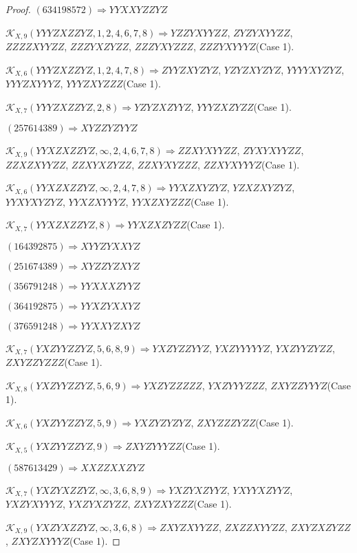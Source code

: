 \documentclass[12pt]{article}
\theoremstyle{plain}
\theoremstyle{definition}
\theoremstyle{remark}
\newcommand{\fancy}[1]{\mathcal{#1}}
\def\K{\fancy{K}}
\begin{document}
\begin{proof}
	$(6 3 4 1 9 8 5 7 2)\Rightarrow YYXXYZZYZ$
	
	
	
	$\K_{X,9}(YYYZXZZYZ,1, 2, 4, 6, 7, 8)\Rightarrow $$YZZYXYYZZ$, $ZYZYXYYZZ$, $ZZZZXYYZZ$, $ZZZYXZYZZ$, $ZZZYXYZZZ$, $ZZZYXYYYZ$(Case 1).
	
	$\K_{X,6}(YYYZXZZYZ,1, 2, 4, 7, 8)\Rightarrow $$ZYYZXYZYZ$, $YZYZXYZYZ$, $YYYYXYZYZ$, $YYYZXYYYZ$, $YYYZXYZZZ$(Case 1).
	
	$\K_{X,7}(YYYZXZZYZ,2, 8)\Rightarrow $$YZYZXZYYZ$, $YYYZXZYZZ$(Case 1).
	
	
	
	$(2 5 7 6 1 4 3 8 9)\Rightarrow XYZZYZYYZ$
	
	
	
	$\K_{X,9}(YYXZXZZYZ,\infty,2, 4, 6, 7, 8)\Rightarrow $$ZZXYXYYZZ$, $ZYXYXYYZZ$, $ZZXZXYYZZ$, $ZZXYXZYZZ$, $ZZXYXYZZZ$, $ZZXYXYYYZ$(Case 1).
	
	$\K_{X,6}(YYXZXZZYZ,\infty,2, 4, 7, 8)\Rightarrow $$YYXZXYZYZ$, $YZXZXYZYZ$, $YYXYXYZYZ$, $YYXZXYYYZ$, $YYXZXYZZZ$(Case 1).
	
	$\K_{X,7}(YYXZXZZYZ,8)\Rightarrow $$YYXZXZYZZ$(Case 1).
	
	
	
	$(1 6 4 3 9 2 8 7 5)\Rightarrow XYYZYXXYZ$
	
	$(2 5 1 6 7 4 3 8 9)\Rightarrow XYZZYZXYZ$
	
	$(3 5 6 7 9 1 2 4 8)\Rightarrow YYXXXZYYZ$
	
	$(3 6 4 1 9 2 8 7 5)\Rightarrow YYXZYXXYZ$
	
	$(3 7 6 5 9 1 2 4 8)\Rightarrow YYXXYZXYZ$
	
	
	
	$\K_{X,7}(YXZYYZZYZ,5, 6, 8, 9)\Rightarrow $$YXZYZZYYZ$, $YXZYYYYYZ$, $YXZYYZYZZ$, $ZXYZZYZZZ$(Case 1).
	
	$\K_{X,8}(YXZYYZZYZ,5, 6, 9)\Rightarrow $$YXZYZZZZZ$, $YXZYYYZZZ$, $ZXYZZYYYZ$(Case 1).
	
	$\K_{X,6}(YXZYYZZYZ,5, 9)\Rightarrow $$YXZYZYZYZ$, $ZXYZZZYZZ$(Case 1).
	
	$\K_{X,5}(YXZYYZZYZ,9)\Rightarrow $$ZXYZYYYZZ$(Case 1).
	
	
	
	$(5 8 7 6 1 3 4 2 9)\Rightarrow XXZZXXZYZ$
	
	
	
	$\K_{X,7}(YXZYXZZYZ,\infty,3, 6, 8, 9)\Rightarrow $$YXZYXZYYZ$, $YXYYXZYYZ$, $YXZYXYYYZ$, $YXZYXZYZZ$, $ZXYZXYZZZ$(Case 1).
	
	$\K_{X,9}(YXZYXZZYZ,\infty,3, 6, 8)\Rightarrow $$ZXYZXYYZZ$, $ZXZZXYYZZ$, $ZXYZXZYZZ$, $ZXYZXYYYZ$(Case 1).
	

\end{proof}
\end{document}

